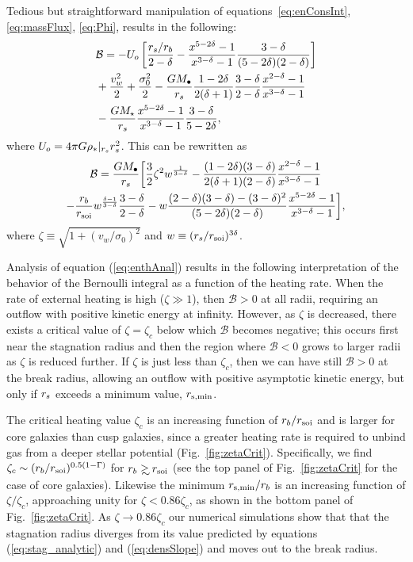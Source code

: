 Tedious but straightforward manipulation of equations~\eqref{eq:enConsInt}, \eqref{eq:massFlux}, \eqref{eq:Phi}, results in the following:
\begin{align}
  &\mathcal{B} = -U_o\left[\frac{r_s/r_b}{2-\delta}-\frac{x^{5-2\delta}-1}{x^{3-\delta}-1}\frac{3-\delta}{(5-2\delta)(2-\delta)}\right]\nonumber\\
  &+\frac{v_w^2}{2}+\frac{\sigma_0^2}{2}- \frac{G M_{\bullet}}{r_s}
  \frac{1-2\delta}{2(\delta+1)}
  \frac{3-\delta}{2-\delta}\frac{x^{2-\delta}-1}{x^{3-\delta}-1}
  \nonumber\\
  &-\frac{G M_\star}{r_s}
  \frac{x^{5-2\delta}-1}{x^{3-\delta}-1}\frac{3-\delta}{5-2\delta},
\end{align}
where $U_o=4 \pi G \rho_*|_{r_s} r_s^2$.  This can be rewritten as
\begin{multline}
  \mathcal{B} =\frac{G M_{\bullet}}{r_s} \biggl[ \frac{3}{2} \zeta^2
  w^{\frac{1}{3 -\delta}}
  -\frac{(1-2\delta)(3-\delta)}{2(\delta+1)(2-\delta)}  \frac{x^{2  -\delta}-1}{x^{3-\delta}-1}\\
  -\frac{r_b}{r_{\rm soi}} w^{\frac{\delta-1}{3-\delta}} \frac{3 -\delta}{2
    -\delta} -w
  \frac{(2-\delta)(3-\delta)-(3-\delta)^{2}}{(5-2\delta)(2-\delta)}
  \frac{x^{5-2\delta}-1}{x^{3-\delta}-1} \biggr],
\label{eq:enthAnal}
\end{multline}
where $\zeta \equiv \sqrt{1 + (v_w/\sigma_0)^2}$ and $w\equiv
(r_s/r_{\rm soi})^{3\delta}$.

Analysis of equation (\ref{eq:enthAnal}) results in the following interpretation of the behavior of the Bernoulli integral as a function of the heating rate.  When the rate of external heating is high ($\zeta \gg 1$), then $\mathcal{B} > 0$ at all radii, requiring an outflow with positive kinetic energy at infinity.  However, as $\zeta$ is decreased, there exists a critical value of $\zeta = \zeta_{c}$ below which $\mathcal{B}$ becomes negative; this occurs first near the stagnation radius and then the region where $\mathcal{B} < 0$ grows to larger radii as $\zeta$ is reduced further.  If $\zeta$ is just less than $\zeta_c$, then we can have still $\mathcal{B} > 0$ at the break radius, allowing an outflow with positive asymptotic kinetic energy, but only if $r_s$ exceeds a minimum value, $r_{\rm s,min}$.  

The critical heating value $\zeta_c$ is an increasing function of $r_{b}/r_{\rm soi}$ and is larger for core galaxies than cusp galaxies, since a greater heating rate is required to unbind gas from a deeper stellar potential (Fig.~\ref{fig:zetaCrit}).  Specifically, we find $\zeta_c\sim (r_b/r_{\rm soi})^{0.5(1-\Gamma)}$ for $\rb\gsim\rsoi$ (see the top panel of Fig.~\ref{fig:zetaCrit} for the case of core galaxies). Likewise the minimum $r_{\rm s,min}/r_{b}$ is an increasing function of $\zeta/\zeta_{c}$, approaching unity for $\zeta < 0.86\zeta_c$, as shown in the bottom panel of Fig.~\ref{fig:zetaCrit}.  As $\zeta \rightarrow 0.86\zeta_c$ our numerical simulations show that that the stagnation radius diverges from its value predicted by equations (\ref{eq:stag_analytic}) and (\ref{eq:densSlope}) and moves out to the break radius.  


